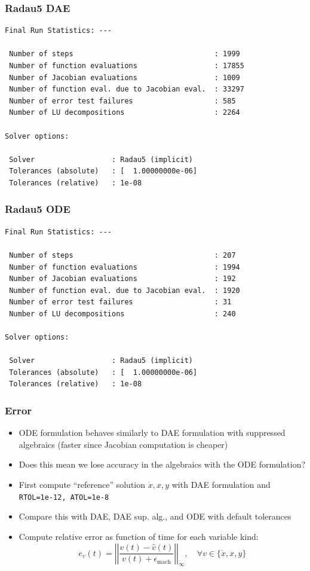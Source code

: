\documentclass[]{beamer}
\begin{document}
\begin{frame}[fragile]
\frametitle{Radau5 DAE}
{\small
\begin{verbatim}
Final Run Statistics: --- 

 Number of steps                                 : 1999
 Number of function evaluations                  : 17855
 Number of Jacobian evaluations                  : 1009
 Number of function eval. due to Jacobian eval.  : 33297
 Number of error test failures                   : 585
 Number of LU decompositions                     : 2264

Solver options:

 Solver                  : Radau5 (implicit)
 Tolerances (absolute)   : [  1.00000000e-06]
 Tolerances (relative)   : 1e-08
\end{verbatim}
}
\end{frame}

\begin{frame}[fragile]
\frametitle{Radau5 ODE}
{\small
\begin{verbatim}
Final Run Statistics: --- 

 Number of steps                                 : 207
 Number of function evaluations                  : 1994
 Number of Jacobian evaluations                  : 192
 Number of function eval. due to Jacobian eval.  : 1920
 Number of error test failures                   : 31
 Number of LU decompositions                     : 240

Solver options:

 Solver                  : Radau5 (implicit)
 Tolerances (absolute)   : [  1.00000000e-06]
 Tolerances (relative)   : 1e-08
\end{verbatim}
}
\end{frame}

\begin{frame}[fragile]
\frametitle{Error}
\begin{itemize}
\item
ODE formulation behaves similarly to DAE formulation with suppressed algebraics (faster since Jacobian computation is cheaper)
\item
Does this mean we lose accuracy in the algebraics with the ODE formulation?
\item
First compute ``reference'' solution $\dot x, x, y$ with DAE formulation and \verb|RTOL=1e-12, ATOL=1e-8|
\item
Compare this with DAE, DAE sup. alg., and ODE with default tolerances
\item
Compute relative error as function of time for each variable kind:
\[e_v(t) = \left|\left|\frac{v(t) - \hat v(t)}{v(t) + \epsilon_{\text{mach}}}\right|\right|_\infty, \quad \forall v \in \{\dot x, x, y\}\]
\end{itemize}
\end{frame}
\end{document}

